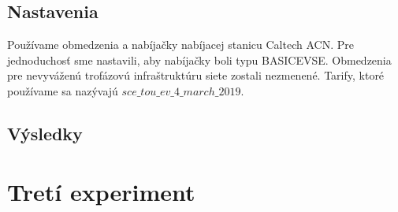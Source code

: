 \subsection{Nastavenia}
Používame obmedzenia a nabíjačky nabíjacej stanicu Caltech ACN. Pre jednoduchosť sme nastavili, aby nabíjačky boli typu BASICEVSE. Obmedzenia pre nevyváženú trofázovú infraštruktúru siete zostali nezmenené.  Tarify, ktoré používame sa nazývajú $sce\_tou\_ev\_4\_march\_2019$.


\subsection{Výsledky}





















\section{Tretí experiment}




